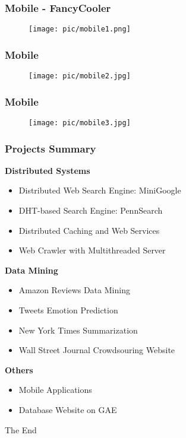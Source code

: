 \documentclass{beamer}
\begin{document}
\begin{frame}
\frametitle{Mobile - FancyCooler}
\begin{figure}
\texttt{[image: pic/mobile1.png]}
\end{figure}
\end{frame}
\begin{frame}
\frametitle{Mobile}
\begin{figure}
\texttt{[image: pic/mobile2.jpg]}
\end{figure}
\end{frame}
\begin{frame}
\frametitle{Mobile}
\begin{figure}
\texttt{[image: pic/mobile3.jpg]}
\end{figure}
\end{frame}





\begin{frame}

\frametitle{Projects Summary}

\textbf{Distributed Systems}
\begin{itemize}
\item Distributed Web Search Engine: MiniGoogle
\item DHT-based Search Engine: PennSearch 
\item Distributed Caching and Web Services
\item Web Crawler with Multithreaded Server 
\end{itemize}


\textbf{Data Mining}
\begin{itemize}
\item Amazon Reviews Data Mining
\item Tweets Emotion Prediction
\item New York Times Summarization
\item Wall Street Journal Crowdsouring Website
\end{itemize}

\textbf{Others}
\begin{itemize}
\item Mobile Applications
\item Database Website on GAE
\end{itemize}

\end{frame}


\begin{frame}
\Huge{\centerline{The End}}
\end{frame}

\end{document}
